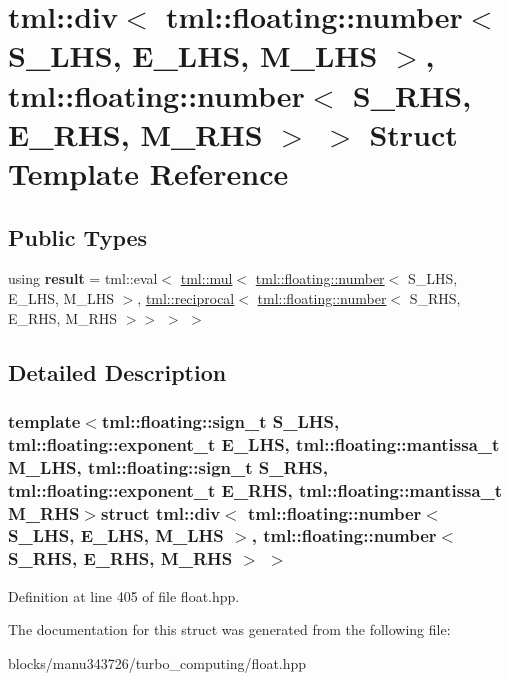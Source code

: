 \hypertarget{structtml_1_1div_3_01tml_1_1floating_1_1number_3_01_s___l_h_s_00_01_e___l_h_s_00_01_m___l_h_s_01eee9ed02a28d6732eb08cede4cbba9bc}{\section{tml\+:\+:div$<$ tml\+:\+:floating\+:\+:number$<$ S\+\_\+\+L\+H\+S, E\+\_\+\+L\+H\+S, M\+\_\+\+L\+H\+S $>$, tml\+:\+:floating\+:\+:number$<$ S\+\_\+\+R\+H\+S, E\+\_\+\+R\+H\+S, M\+\_\+\+R\+H\+S $>$ $>$ Struct Template Reference}
\label{structtml_1_1div_3_01tml_1_1floating_1_1number_3_01_s___l_h_s_00_01_e___l_h_s_00_01_m___l_h_s_01eee9ed02a28d6732eb08cede4cbba9bc}
}
\subsection*{Public Types}
\begin{DoxyCompactItemize}
\item 
\hypertarget{structtml_1_1div_3_01tml_1_1floating_1_1number_3_01_s___l_h_s_00_01_e___l_h_s_00_01_m___l_h_s_01eee9ed02a28d6732eb08cede4cbba9bc_aff22697dc1ccedd10ffe18fe6c2974f9}{using {\bfseries result} = tml\+::eval$<$ \hyperlink{structtml_1_1mul}{tml\+::mul}$<$ \hyperlink{structtml_1_1floating_1_1number}{tml\+::floating\+::number}$<$ S\+\_\+\+L\+H\+S, E\+\_\+\+L\+H\+S, M\+\_\+\+L\+H\+S $>$, \hyperlink{structtml_1_1reciprocal}{tml\+::reciprocal}$<$ \hyperlink{structtml_1_1floating_1_1number}{tml\+::floating\+::number}$<$ S\+\_\+\+R\+H\+S, E\+\_\+\+R\+H\+S, M\+\_\+\+R\+H\+S $>$$>$ $>$ $>$}\label{structtml_1_1div_3_01tml_1_1floating_1_1number_3_01_s___l_h_s_00_01_e___l_h_s_00_01_m___l_h_s_01eee9ed02a28d6732eb08cede4cbba9bc_aff22697dc1ccedd10ffe18fe6c2974f9}

\end{DoxyCompactItemize}


\subsection{Detailed Description}
\subsubsection*{template$<$tml\+::floating\+::sign\+\_\+t S\+\_\+\+L\+H\+S, tml\+::floating\+::exponent\+\_\+t E\+\_\+\+L\+H\+S, tml\+::floating\+::mantissa\+\_\+t M\+\_\+\+L\+H\+S, tml\+::floating\+::sign\+\_\+t S\+\_\+\+R\+H\+S, tml\+::floating\+::exponent\+\_\+t E\+\_\+\+R\+H\+S, tml\+::floating\+::mantissa\+\_\+t M\+\_\+\+R\+H\+S$>$struct tml\+::div$<$ tml\+::floating\+::number$<$ S\+\_\+\+L\+H\+S, E\+\_\+\+L\+H\+S, M\+\_\+\+L\+H\+S $>$, tml\+::floating\+::number$<$ S\+\_\+\+R\+H\+S, E\+\_\+\+R\+H\+S, M\+\_\+\+R\+H\+S $>$ $>$}



Definition at line 405 of file float.\+hpp.



The documentation for this struct was generated from the following file\+:\begin{DoxyCompactItemize}
\item 
blocks/manu343726/turbo\+\_\+computing/float.\+hpp\end{DoxyCompactItemize}
